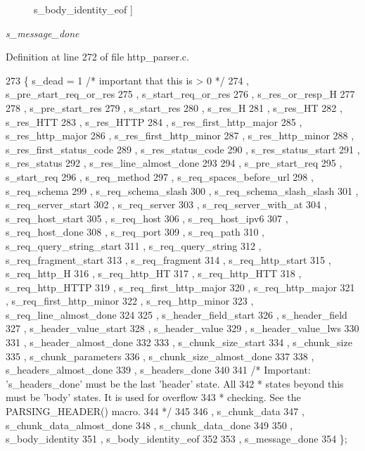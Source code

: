 \begin{Desc}
\begin{description}
{s\+\_\+body\+\_\+identity\+\_\+eof\label{http__parser_8c_adc6e5733fc3c22f0a7b2914188c49c90a1ae8a6fc8117d6baa6a0812d077f5b73}
}]\item[{\em 
s\+\_\+message\+\_\+done\label{http__parser_8c_adc6e5733fc3c22f0a7b2914188c49c90ae830ce7380ef6c61643a332ab63f6774}
}]\end{description}
\end{Desc}


Definition at line 272 of file http\+\_\+parser.\+c.


\begin{DoxyCode}
273   \{ s_dead = 1 \textcolor{comment}{/* important that this is > 0 */}
274   , s_pre_start_req_or_res
275   , s_start_req_or_res
276   , s_res_or_resp_H
277 
278   , s_pre_start_res
279   , s_start_res
280   , s_res_H
281   , s_res_HT
282   , s_res_HTT
283   , s_res_HTTP
284   , s_res_first_http_major
285   , s_res_http_major
286   , s_res_first_http_minor
287   , s_res_http_minor
288   , s_res_first_status_code
289   , s_res_status_code
290   , s_res_status_start
291   , s_res_status
292   , s_res_line_almost_done
293 
294   , s_pre_start_req
295   , s_start_req
296   , s_req_method
297   , s_req_spaces_before_url
298   , s_req_schema
299   , s_req_schema_slash
300   , s_req_schema_slash_slash
301   , s_req_server_start
302   , s_req_server
303   , s_req_server_with_at
304   , s_req_host_start
305   , s_req_host
306   , s_req_host_ipv6
307   , s_req_host_done
308   , s_req_port
309   , s_req_path
310   , s_req_query_string_start
311   , s_req_query_string
312   , s_req_fragment_start
313   , s_req_fragment
314   , s_req_http_start
315   , s_req_http_H
316   , s_req_http_HT
317   , s_req_http_HTT
318   , s_req_http_HTTP
319   , s_req_first_http_major
320   , s_req_http_major
321   , s_req_first_http_minor
322   , s_req_http_minor
323   , s_req_line_almost_done
324 
325   , s_header_field_start
326   , s_header_field
327   , s_header_value_start
328   , s_header_value
329   , s_header_value_lws
330 
331   , s_header_almost_done
332 
333   , s_chunk_size_start
334   , s_chunk_size
335   , s_chunk_parameters
336   , s_chunk_size_almost_done
337 
338   , s_headers_almost_done
339   , s_headers_done
340 
341   \textcolor{comment}{/* Important: 's\_headers\_done' must be the last 'header' state. All}
342 \textcolor{comment}{   * states beyond this must be 'body' states. It is used for overflow}
343 \textcolor{comment}{   * checking. See the PARSING\_HEADER() macro.}
344 \textcolor{comment}{   */}
345 
346   , s_chunk_data
347   , s_chunk_data_almost_done
348   , s_chunk_data_done
349 
350   , s_body_identity
351   , s_body_identity_eof
352 
353   , s_message_done
354   \};
\end{DoxyCode}


